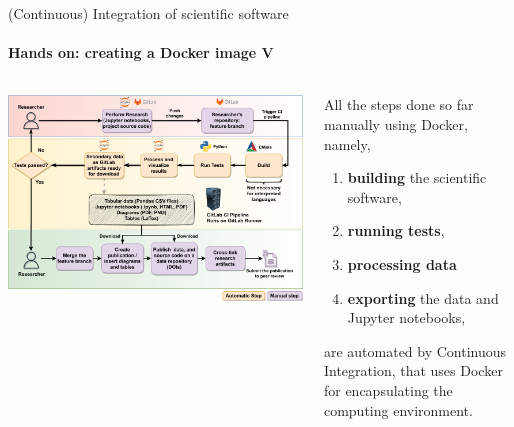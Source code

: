 \begin{frame}{(Continuous) Integration of scientific software} 
    \framesubtitle{Hands on: creating a Docker image V} 
    \vfill

    \begin{columns}
        \begin{column}[c]{0.55\textwidth}
            \includegraphics[width=\columnwidth]{figures/ZINF-CI-diagram-individual.pdf}
        \end{column}
        \begin{column}[c]{0.40\textwidth}
            All the steps done so far manually using Docker, namely,

            \begin{enumerate}
                \item \textbf{building} the scientific software, 
                \item \textbf{running tests}, 
                \item \textbf{processing data} 
                \item \textbf{exporting} the data and Jupyter notebooks, 
            \end{enumerate}

            are automated by Continuous Integration, that uses Docker for encapsulating the computing environment. 
        \end{column}
    \end{columns}

\end{frame}


